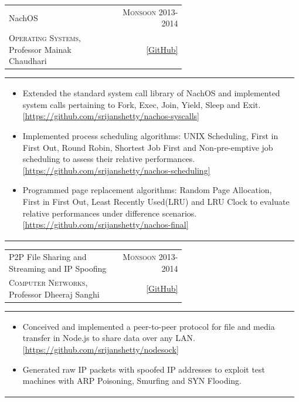 \documentclass[a4paper]{article} %
\newcommand{\cproject}[5]{
    \begin{tabular}{p{0.60\linewidth}r}
        \textcolor{NavyBlue}{\small #2} & \multicolumn{1}{m{7.3cm}}{\raggedleft \small {\textsc{#1}}}\\
        \small {#3} & \small {#4}
    \end{tabular}
    \begin{tabular}{p{0.98\linewidth}}
    \vspace{-0.3cm}
        \footnotesize {#5}
    \end{tabular}
    \vspace{-0.45cm}
}
\begin{document}
\cproject
    {Monsoon 2013-2014}
    {NachOS}
    {\textsc{Operating Systems}, Professor Mainak Chaudhari}
    {\href{https://github.com/srijanshetty/} {[GitHub]} }
    {
     \begin{itemize}[leftmargin=0.5cm]
         \item Extended the standard system call library of NachOS and implemented system calls pertaining to Fork, Exec,
             Join, Yield, Sleep and Exit.
             \href{https://github.com/srijanshetty/nachos-syscalls/}{[https://github.com/srijanshetty/nachos-syscalls]}
         \item Implemented process scheduling algorithms: UNIX Scheduling, First in First Out,
             Round Robin, Shortest Job First and Non-pre-emptive job scheduling to assess their relative performances.
             \href{https://github.com/srijanshetty/nachos-scheduling}{[https://github.com/srijanshetty/nachos-scheduling]}
         \item Programmed page replacement algorithms: Random Page Allocation, First in First Out,
             Least Recently Used(LRU) and LRU Clock to evaluate relative performances under difference scenarios.
             \href{https://github.com/srijanshetty/nachos-final}{[https://github.com/srijanshetty/nachos-final]}
      \end{itemize}
    }

\cproject
    {Monsoon 2013-2014}
    {P2P File Sharing and Streaming and IP Spoofing}
    {\textsc{Computer Networks}, Professor Dheeraj Sanghi}
    { \href{https://github.com/srijanshetty/nodesock} {[GitHub]} }
    {
        \begin{itemize}[leftmargin=0.5cm]
            \item Conceived and implemented a peer-to-peer protocol for file and media transfer in Node.js to share
                data over any LAN.  \href{https://github.com/srijanshetty/nodesock} {[https://github.com/srijanshetty/nodesock]}
            \item Generated raw IP packets with spoofed IP addresses to exploit test machines with ARP Poisoning,
                Smurfing and SYN Flooding.
        \end{itemize}
    }

%
\end{document}
